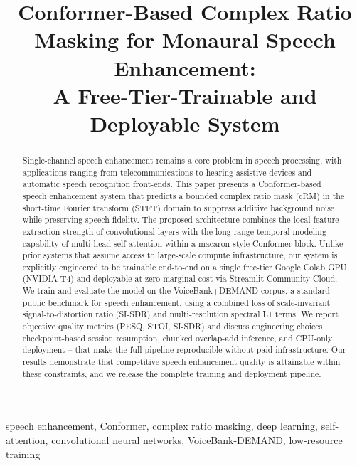 \documentclass[conference]{IEEEtran}
\begin{document}
\title{Conformer-Based Complex Ratio Masking for Monaural Speech Enhancement: \\
A Free-Tier-Trainable and Deployable System}

\author{
}

\maketitle

\begin{abstract}
Single-channel speech enhancement remains a core problem in speech processing, with
applications ranging from telecommunications to hearing assistive devices and automatic
speech recognition front-ends. This paper presents a Conformer-based speech enhancement
system that predicts a bounded complex ratio mask (cRM) in the short-time Fourier transform
(STFT) domain to suppress additive background noise while preserving speech fidelity. The
proposed architecture combines the local feature-extraction strength of convolutional
layers with the long-range temporal modeling capability of multi-head self-attention within
a macaron-style Conformer block. Unlike prior systems that assume access to large-scale
compute infrastructure, our system is explicitly engineered to be trainable end-to-end on a
single free-tier Google Colab GPU (NVIDIA T4) and deployable at zero marginal cost via
Streamlit Community Cloud. We train and evaluate the model on the VoiceBank+DEMAND corpus, a
standard public benchmark for speech enhancement, using a combined loss of scale-invariant
signal-to-distortion ratio (SI-SDR) and multi-resolution spectral L1 terms. We report
objective quality metrics (PESQ, STOI, SI-SDR) and discuss engineering choices --
checkpoint-based session resumption, chunked overlap-add inference, and CPU-only deployment
-- that make the full pipeline reproducible without paid infrastructure. Our results
demonstrate that competitive speech enhancement quality is attainable within these
constraints, and we release the complete training and deployment pipeline.
\end{abstract}

\begin{IEEEkeywords}
speech enhancement, Conformer, complex ratio masking, deep learning, self-attention,
convolutional neural networks, VoiceBank-DEMAND, low-resource training
\end{IEEEkeywords}
\end{document}
